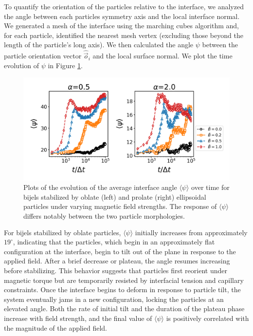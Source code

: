 To quantify the orientation of the particles relative to the interface, we analyzed the angle between each particles symmetry axis and 
the local interface normal. We generated a mesh of the interface using the marching cubes algorithm and, for each particle, identified the nearest mesh vertex 
(excluding those beyond the length of the particle's long axis). We then calculated the angle \(\psi\) between the particle orientation vector 
\(\hat{\vec{o}}_i\) and the local surface normal. We plot the time evolution of $\psi$ in Figure \ref{fig:interface_angle-field_on}.

\begin{figure} 
    \centering 
    \includegraphics[scale=0.6]{../figures/results/paper2/psi-field_on.png} 
    \caption{Plots of the evolution of the average interface angle \(\langle \psi \rangle\) over time for bijels stabilized 
             by oblate (left) and prolate (right) ellipsoidal particles under varying magnetic field strengths. The response of \(\langle \psi \rangle\) 
             differs notably between the two particle morphologies.} 
    \label{fig:interface_angle-field_on} 
\end{figure}

For bijels stabilized by oblate particles, \(\langle \psi \rangle\) initially increases from approximately \(19^\circ\), indicating that the particles, which begin 
in an approximately flat configuration at the interface, begin to tilt out of the plane in response to the applied field. After a brief decrease or plateau, the angle 
resumes increasing before stabilizing. This behavior suggests that particles first reorient under magnetic torque but are temporarily resisted by interfacial tension 
and capillary constraints. Once the interface begins to deform in response to particle tilt, the system eventually jams in a new configuration, locking the particles 
at an elevated angle. Both the rate of initial tilt and the duration of the plateau phase increase with field strength, and the final value of 
\(\langle \psi \rangle\) is positively correlated with the magnitude of the applied field.

